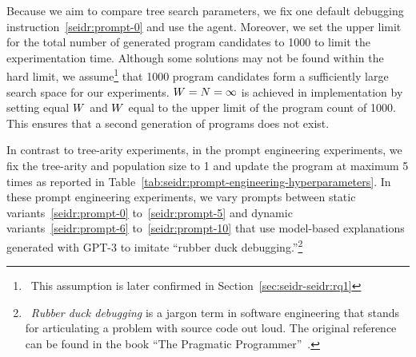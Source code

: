 Because we aim to compare tree search parameters, we fix one default debugging instruction~\ref{seidr:prompt-0} and use the \instructs{} agent. 
Moreover, we set the upper limit for the total number of generated program candidates to 1000 to limit the experimentation time. 
Although some solutions may not be found within the hard limit, we assume\footnote{~This assumption is later confirmed in Section~\ref{sec:seidr-seidr:rq1}} that 1000 program candidates form a sufficiently large search space for our experiments.
$W{} = N{} = \infty$ is achieved in implementation by setting equal $W{}$ and $W{}$ equal to the upper limit of the program count of 1000.
This ensures that a second generation of programs does not exist.

In contrast to tree-arity experiments, in the prompt engineering experiments, we fix the tree-arity and population size to 1 and update the program at maximum 5 times as reported in Table~\ref{tab:seidr:prompt-engineering-hyperparameters}. 
In these prompt engineering experiments, we vary prompts between static variants~\ref{seidr:prompt-0}
to~\ref{seidr:prompt-5} and dynamic variants~\ref{seidr:prompt-6}
to~\ref{seidr:prompt-10} that use model-based explanations generated with GPT-3 to imitate ``rubber duck debugging.''\footnote{~\emph{Rubber duck debugging} is a jargon term in software engineering that stands for articulating a problem with source code out loud. The original reference can be found in the book ``The Pragmatic Programmer''~\cite{hunt1999:pragmatic}.} 

